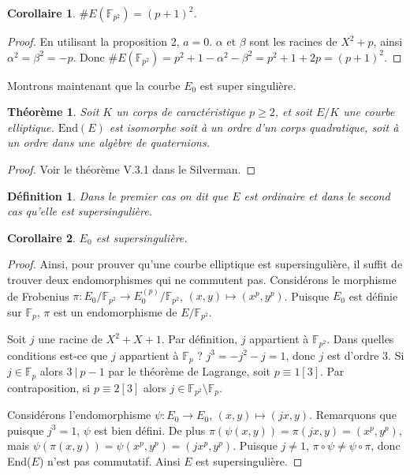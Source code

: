 \documentclass{article}
\newtheorem{thm}{Théorème}
\newtheorem{deff}{Définition}
\newtheorem{cor}{Corollaire}
\newcommand{\Fp}{\mathbb{F}_{p}}
\newcommand{\Fq}{\mathbb{F}_{p^2}}
\begin{document}
\begin{cor}
$\#E(\Fq) = (p+1)^2$.
\end{cor}

\begin{proof}
  En utilisant la proposition 2, $a = 0$. $\alpha$ et $\beta$ sont les racines de $X^2 + p$, ainsi $\alpha^2 = \beta^2 = -p$. Donc $\#E(\Fq) = p^2 + 1 - \alpha^2 - \beta^2 = p^2 + 1 + 2p = (p+1)^2$.
\end{proof}


Montrons maintenant que la courbe $E_0$ est super singulière.

\begin{thm}
  Soit $K$ un corps de caractéristique $p\ge 2$, et soit $E/K$ une courbe elliptique. $\mathrm{End}(E)$ est isomorphe soit à un ordre d'un corps quadratique, soit à un ordre dans une algèbre de quaternions. 
\end{thm}

\begin{proof}
  Voir le théorème V.3.1 dans le Silverman.
\end{proof}

\begin{deff}
  Dans le premier cas on dit que $E$ est \textit{ordinaire} et dans le second cas qu'elle est \textit{supersingulière}.
\end{deff}

\begin{cor}
  $E_0$ est supersingulière.
\end{cor}

\begin{proof}
Ainsi, pour prouver qu'une courbe elliptique est supersingulière, il suffit de trouver deux endomorphismes qui ne commutent pas.
Considérons le morphisme de Frobenius $\pi : E_0/\Fq \to E_0^{(p)}/\Fq$, $(x, y) \mapsto (x^p, y^p)$. 
Puisque $E_0$ est définie sur $\Fp$, $\pi$ est un endomorphisme de $E/\Fq$.

Soit $j$ une racine de $X^2 + X + 1$. Par définition, $j$ appartient à $\Fq$. Dans quelles conditions est-ce que $j$ appartient à $\Fp$ ? $j^3 = -j^2 -j = 1$, donc $j$ est d'ordre $3$. Si $j\in \Fp$ alors $3\ |\ p-1$ par le théorème de Lagrange, soit $p\equiv 1[3]$. Par contraposition, si $p \equiv 2 [3]$ alors $j\in\Fq\setminus\Fp$.

Considérons l'endomorphisme $\psi : E_0 \to E_0$, $(x, y) \mapsto (jx, y)$. 
Remarquons que puisque $j^3 = 1$, $\psi$ est bien défini.
De plus $\pi(\psi(x, y)) = \pi(jx, y) = (x^p, y^p)$, mais $\psi(\pi(x, y)) = \psi(x^p, y^p) = (jx^p, y^p)$. 
Puisque $j\neq 1$, $\pi \circ \psi \neq \psi \circ \pi$, donc End($E$) n'est pas commutatif.
Ainsi $E$ est supersingulière.
\end{proof}
\end{document}
